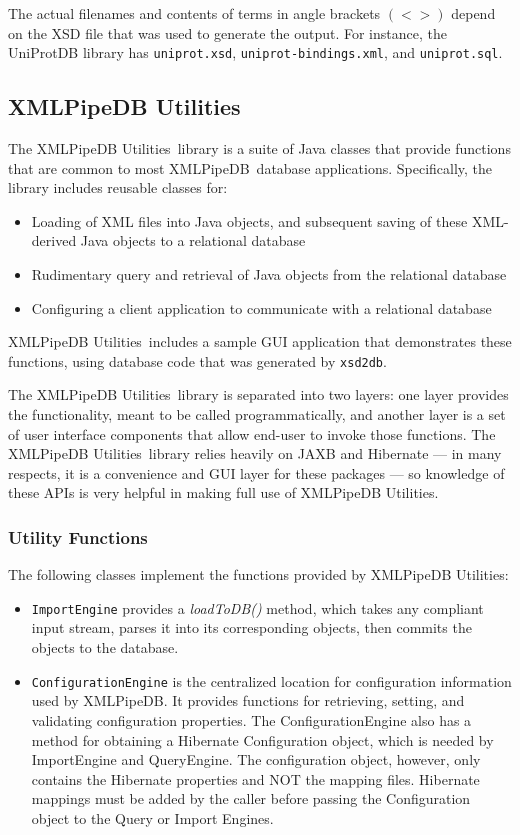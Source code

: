 \documentclass[10pt]{bmc_article}
\newenvironment{bmcformat}{\begin{raggedright}\baselineskip20pt\sloppy\setboolean{publ}{false}}{\end{raggedright}\baselineskip20pt\sloppy}
\def\xmlpipedb{XMLPipeDB}                       %
\def\xsd2db{\texttt{xsd2db}}
\def\xpdutils{XMLPipeDB Utilities}
\begin{document}
\begin{bmcformat}
The actual filenames and contents of terms in angle brackets $(< >)$ depend on the XSD file that was used to generate the output.  For instance, the UniProtDB library has \texttt{uniprot.xsd}, \texttt{uniprot-bindings.xml}, and \texttt{uniprot.sql}.\pb

\subsection*{\xpdutils}

The \xpdutils\ library is a suite of Java classes that provide functions that are common to most \xmlpipedb\ database applications.  Specifically, the library includes reusable classes for:
\begin{itemize}
\item Loading of XML files into Java objects, and subsequent saving of these XML-derived Java objects to a relational database
\item Rudimentary query and retrieval of Java objects from the relational database
\item Configuring a client application to communicate with a relational database
\end{itemize}
\xpdutils\ includes a sample GUI application that demonstrates these functions, using database code that was generated by \xsd2db.\pb

The \xpdutils\ library is separated into two layers: one layer provides the functionality, meant to be called programmatically, and another layer is a set of user interface components that allow end-user to invoke those functions.  The \xpdutils\ library relies heavily on JAXB and Hibernate --- in many respects, it is a convenience and GUI layer for these packages --- so knowledge of these APIs is very helpful in making full use of \xpdutils.\pb

\subsubsection*{Utility Functions}

The following classes implement the functions provided by \xpdutils:
\begin{itemize}
\item \texttt{ImportEngine} provides a \emph{loadToDB()} method, which takes any compliant input stream, parses it into its corresponding objects, then commits the objects to the database.

\item \texttt{ConfigurationEngine} is the centralized location for configuration information used by XMLPipeDB.  It provides functions for retrieving, setting, and validating configuration properties. The ConfigurationEngine also has a method for obtaining a Hibernate Configuration object, which is needed by ImportEngine and QueryEngine. The configuration object, however, only contains the Hibernate properties and NOT the mapping files. Hibernate mappings must be added by the caller before passing the Configuration object to the Query or Import Engines.


\end{itemize}
\end{bmcformat}
\end{document}
